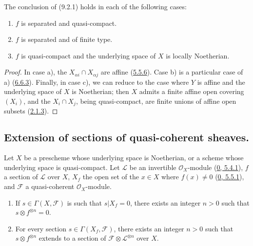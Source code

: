 \begin{corollary}[9.2.2]
\label{I.9.2.2}
The conclusion of (9.2.1) holds in each of the following cases:
\begin{enumerate}
\item[a)] $f$ is separated and quasi-compact.
\item[b)] $f$ is separated and of finite type.
\item[c)] $f$ is quasi-compact and the underlying space of $X$ is locally
Noetherian.
\end{enumerate}
\end{corollary}

\begin{proof}
In case a), the $X_{\alpha i}\cap X_{\alpha j}$ are affine
(\hyperref[I.5.5.6]{5.5.6}). Case b) is a particular case of a)
(\hyperref[I.6.6.3]{6.6.3}). Finally, in case c), we can reduce to the
case where $Y$ is affine and the underlying space of $X$ is Noetherian; then
$X$ admits a finite affine open covering $(X_i)$, and the $X_i\cap X_j$,
being quasi-compact, are finite unions of affine open subsets
(\hyperref[I.2.1.3]{2.1.3}).
\end{proof}

\subsection{Extension of sections of quasi-coherent sheaves.}
\label{subsection:I.9.3}

\begin{theorem}[9.3.1]
\label{I.9.3.1}
Let $X$ be a prescheme whose underlying space is Noetherian, or a scheme
whose underlying space is quasi-compact. Let $\mathscr{L}$ be an invertible
$\mathscr{O}_X$-module
(\hyperref[0.5.4.1]{0, 5.4.1}), $f$ a section of $\mathscr{L}$ over
$X$, $X_f$ the open set of the $x\in X$ where $f(x)\neq0$
(\hyperref[0.5.5.1]{0, 5.5.1}), and $\mathscr{F}$ a quasi-coherent
$\mathscr{O}_X$-module.
\begin{enumerate}
\item[(i)] If $s\in\Gamma(X,\mathscr{F})$ is such that $s|X_f=0$, there exists
an integer $n>0$ such that $s\otimes f^{\otimes n}=0$.
\item[(ii)] For every section $s\in\Gamma(X_f,\mathscr{F})$, there exists an
integer $n>0$ such that $s\otimes f^{\otimes n}$ extends to a section of
$\mathscr{F}\otimes\mathscr{L}^{\otimes n}$ over $X$.
\end{enumerate}
\end{theorem}

